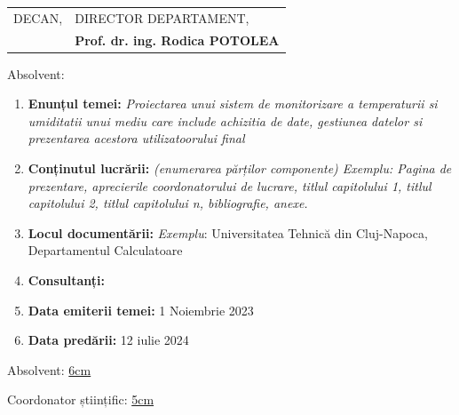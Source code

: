 \begin{tabular}{p{7cm}p{8cm}}
	\hspace{-1cm}DECAN, & DIRECTOR DEPARTAMENT,\\
	\hspace{-1cm}{\bf Prof. dr. ing. Mihaela DÎNȘOREANU} & {\bf Prof. dr. ing. Rodica POTOLEA}\\  
\end{tabular}

\vspace{2cm}

\begin{center}
	Absolvent: {\bf \thesisauthor}
	
	\vspace{1cm}
	
	{\bf \thesistitle}
\end{center}

\vspace{5mm}
\begin{enumerate}
	\item {\bf Enunțul temei:} {\it Proiectarea unui sistem de monitorizare a temperaturii si umiditatii unui mediu care include achizitia de date, gestiunea datelor si prezentarea acestora utilizatoorului final}
	\item {\bf Conținutul lucrării:} {\it (enumerarea părților componente) Exemplu: Pagina de prezentare, aprecierile coordonatorului de lucrare, titlul capitolului 1, titlul capitolului 2, titlul capitolului n, bibliografie, anexe.}
	\item {\bf Locul documentării:} {\it Exemplu}: Universitatea Tehnică din Cluj-Napoca, Departamentul Calculatoare
	\item {\bf Consultanți:}
	\item {\bf Data emiterii temei:} 1 Noiembrie 2023 %
	\item {\bf Data predării:} 12 iulie 2024 %
\end{enumerate}
\vspace{1.2cm}

\hspace{6cm} Absolvent: \uline{6cm} 

\vspace{0.5cm}
\hspace{6cm} Coordonator științific: \uline{5cm} 
\newpage
\begin{center}
	{\department}
\end{center}
\vspace{0.5cm}

